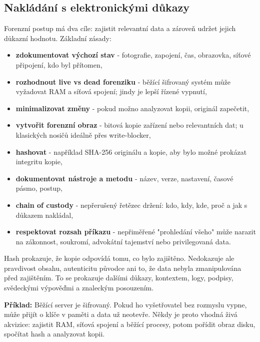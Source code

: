 \documentclass[11pt,a4paper]{article}
\newcommand{\priklad}[1]{\begin{tcolorbox}[breakable,enhanced,colback=green!7,colframe=green!30!black,boxrule=0pt,arc=1mm,left=5pt,right=5pt,top=5pt,bottom=5pt,before skip=6pt,after skip=6pt]\textbf{Příklad:} #1\end{tcolorbox}}
\begin{document}
\subsection*{Nakládání s elektronickými důkazy}
Forenzní postup má dva cíle: zajistit relevantní data a zároveň udržet jejich důkazní hodnotu. Základní zásady:
\begin{itemize}
  \item \textbf{zdokumentovat výchozí stav} - fotografie, zapojení, čas, obrazovka, síťové připojení, kdo byl přítomen,
  \item \textbf{rozhodnout live vs dead forenziku} - běžící šifrovaný systém může vyžadovat RAM a síťová spojení; jindy je lepší řízené vypnutí,
  \item \textbf{minimalizovat změny} - pokud možno analyzovat kopii, originál zapečetit,
  \item \textbf{vytvořit forenzní obraz} - bitová kopie zařízení nebo relevantních dat; u klasických nosičů ideálně přes write-blocker,
  \item \textbf{hashovat} - například SHA-256 originálu a kopie, aby bylo možné prokázat integritu kopie,
  \item \textbf{dokumentovat nástroje a metodu} - název, verze, nastavení, časové pásmo, postup,
  \item \textbf{chain of custody} - nepřerušený řetězec držení: kdo, kdy, kde, proč a jak s důkazem nakládal,
  \item \textbf{respektovat rozsah příkazu} - nepřiměřené "prohledání všeho" může narazit na zákonnost, soukromí, advokátní tajemství nebo privilegovaná data.
\end{itemize}

Hash prokazuje, že kopie odpovídá tomu, co bylo zajištěno. Nedokazuje ale pravdivost obsahu, autenticitu původce ani to, že data nebyla zmanipulována před zajištěním. To se prokazuje dalšími důkazy, kontextem, logy, podpisy, svědeckými výpověďmi a znaleckým posouzením.

\priklad{Běžící server je šifrovaný. Pokud ho vyšetřovatel bez rozmyslu vypne, může přijít o klíče v paměti a data už neotevře. Někdy je proto vhodná živá akvizice: zajistit RAM, síťová spojení a běžící procesy, potom pořídit obraz disku, spočítat hash a analyzovat kopii.}
\end{document}
